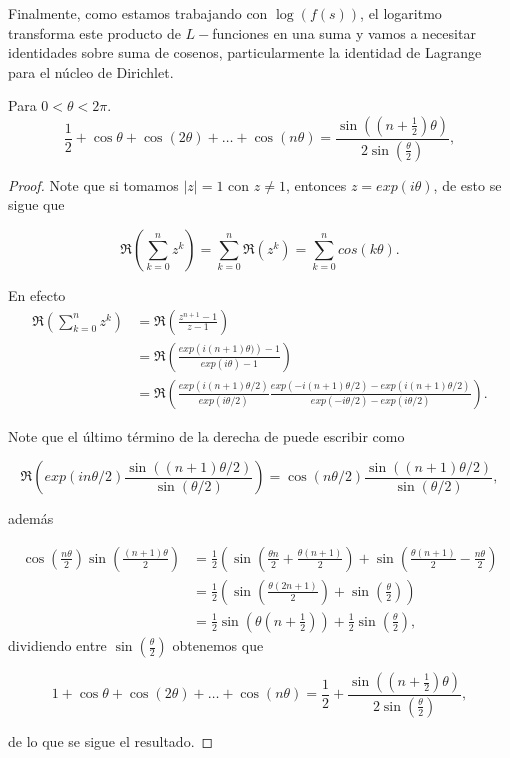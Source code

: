  Finalmente, como estamos trabajando con $\log(f(s))$, el logaritmo transforma este producto de $L-$funciones en una suma y vamos a necesitar identidades sobre suma de cosenos, particularmente la identidad de Lagrange para el núcleo de Dirichlet.

 \begin{theorem}
Para $0 < \theta < 2\pi$.
     \[
    \frac{1}{2} + \cos \theta + \cos(2\theta) + \dots + \cos(n\theta) = \frac{\sin\left((n + \frac{1}{2})\theta\right)}{2 \sin\left(\frac{\theta}{2}\right)},
    \]
 \end{theorem}

 \begin{proof}
     Note que si tomamos $|z|=1$ con $z\neq 1$, entonces $z=exp(i\theta)$, de esto se sigue que

    $$\Re\left(\sum_{k=0}^{n} z^k\right)=\sum_{k=0}^{n} \Re(z^k)=\sum_{k=0}^{n}cos(k\theta).$$

    En efecto
    \begin{align*}
      \Re\left(\sum_{k=0}^{n} z^k\right)&=\Re\left(\frac{z^{n+1}-1}{z-1}\right)\\
      &=\Re\left(\frac{exp\left(i(n+1)\theta)\right) -1}{exp(i\theta)-1}\right)\\
      &=\Re\left(\frac{exp(i(n+1)\theta/2)}{exp(i\theta/2)}\frac{exp(-i(n+1)\theta/2)-exp(i(n+1)\theta/2)}{exp(-i\theta/2)-exp(i\theta/2)}\right)
    .\end{align*}

   Note que el último término de la derecha  de puede escribir como

   $$\Re\left(exp(in\theta/2)\frac{\sin\left((n+1)\theta/2\right)}{\sin(\theta/2)}\right)=\cos(n\theta/2)\frac{\sin((n+1)\theta/2)}{\sin(\theta/2)},$$

   además
   
   $$
\begin{aligned}
\cos \left(\frac{n \theta}{2}\right) \sin \left(\frac{(n+1) \theta}{2}\right)&=\frac{1}{2}\left(\sin \left(\frac{\theta n}{2}+\frac{\theta(n+1)}{2}\right)+\sin \left(\frac{\theta(n+1)}{2}-\frac{n \theta}{2}\right)\right. \\
& =\frac{1}{2}\left(\sin \left(\frac{\theta(2 n+1)}{2}\right)+\sin \left(\frac{\theta}{2}\right)\right) \\
& =\frac{1}{2} \sin \left(\theta\left(n+\frac{1}{2}\right)\right)+\frac{1}{2} \sin \left(\frac{\theta}{2}\right),
\end{aligned}
$$
dividiendo entre $\sin\left(\displaystyle\frac{\theta}{2}\right)$ obtenemos que

\[
    1 + \cos \theta + \cos(2\theta) + \dots + \cos(n\theta) = \frac{1}{2} + \frac{\sin\left((n + \frac{1}{2})\theta\right)}{2 \sin\left(\frac{\theta}{2}\right)},
    \]

de lo que se sigue el resultado.
 \end{proof}

